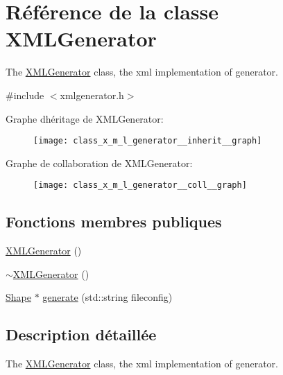 \hypertarget{class_x_m_l_generator}{}\section{Référence de la classe X\+M\+L\+Generator}
\label{class_x_m_l_generator}


The \hyperlink{class_x_m_l_generator}{X\+M\+L\+Generator} class, the xml implementation of generator.  




{\ttfamily \#include $<$xmlgenerator.\+h$>$}



Graphe d\textquotesingle{}héritage de X\+M\+L\+Generator\+:\nopagebreak
\begin{figure}[H]
\begin{center}
\leavevmode
\texttt{[image: class\_x\_m\_l\_generator\_\_inherit\_\_graph]}
\end{center}
\end{figure}


Graphe de collaboration de X\+M\+L\+Generator\+:\nopagebreak
\begin{figure}[H]
\begin{center}
\leavevmode
\texttt{[image: class\_x\_m\_l\_generator\_\_coll\_\_graph]}
\end{center}
\end{figure}
\subsection*{Fonctions membres publiques}
\begin{DoxyCompactItemize}
\item 
\hyperlink{class_x_m_l_generator_ae88722c986a3d984f0050be10d69e6aa}{X\+M\+L\+Generator} ()
\item 
\hyperlink{class_x_m_l_generator_a8f947bac9f682ba5a22ccb98ff88ff81}{$\sim$\+X\+M\+L\+Generator} ()
\item 
\hyperlink{class_shape}{Shape} $\ast$ \hyperlink{class_x_m_l_generator_aea905ef316503fe716d368ae21f25b9b}{generate} (std\+::string fileconfig)
\end{DoxyCompactItemize}


\subsection{Description détaillée}
The \hyperlink{class_x_m_l_generator}{X\+M\+L\+Generator} class, the xml implementation of generator. 

